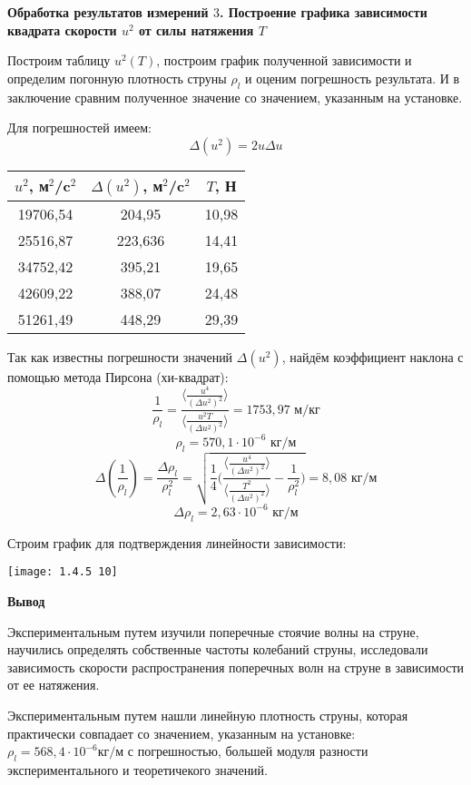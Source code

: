 \documentclass[a4paper,12pt]{article} %
\begin{document}
{\bf Обработка результатов измерений $3$. Построение графика зависимости квадрата скорости $u^2$ от силы натяжения
$T$}

Построим таблицу $u^2(T)$, построим график полученной зависимости и определим погонную плотность струны $\rho_l$ и оценим погрешность результата. И в заключение сравним полученное значение со значением, указанным на установке.

Для погрешностей имеем:
\[\Delta (u^2) = 2u\Delta u\]

\begin{center}
\begin{tabular}{|c|c|c|}
\hline 
$u^2$, м$^2$/c$^2$ & $\Delta (u^2)$, м$^2$/c$^2$& $T$, Н \\ 
\hline 
19706,54 &204,95& 10,98 \\ 
\hline 
25516,87 &223,636& 14,41 \\ 
\hline 
34752,42 &395,21& 19,65 \\ 
\hline 
42609,22 &388,07& 24,48 \\ 
\hline 
51261,49 &448,29& 29,39 \\ 
\hline 
\end{tabular} 
\end{center}

Так как известны погрешности значений $\Delta (u^2)$, найдём коэффициент наклона с помощью метода Пирсона (хи-квадрат):
\[\frac{1}{\rho_l} = \frac{\langle \frac{u^4}{(\Delta u^2)^2} \rangle}{\langle \frac{u^2 T}{(\Delta u^2)^2} \rangle}  = 1753,97 \text{ м/кг}\]
\[\rho_l = 570,1 \cdot 10^{-6} \text{ кг/м}\]
\[\Delta (\frac{1}{\rho_l}) = \frac{\Delta \rho_l}{\rho^2_l} = \sqrt{\frac{1}{4} \Big( \frac{\langle \frac{u^4}{(\Delta u^2)^2} \rangle}{\langle \frac{T^2}{(\Delta u^2)^2} \rangle}  - \frac{1}{\rho_l^2}\Big)} = 8,08 \text{ кг/м}\]
\[\Delta \rho_l = 2,63  \cdot 10^{-6} \text{ кг/м}\]

Строим график для подтверждения линейности зависимости:

\begin{center}
\texttt{[image: 1.4.5 10]}
\end{center}

{\bf Вывод }

Экспериментальным путем изучили поперечные стоячие волны на струне, научились определять собственные частоты колебаний струны, исследовали зависимость скорости распространения поперечных волн на струне в зависимости от ее натяжения. 

Экспериментальным путем нашли линейную плотность струны, которая практически совпадает со значением, указанным на установке: $\rho_l = 568,4 \cdot 10^{-6} \text{кг/м}$ с погрешностью, большей модуля разности экспериментального и теоретичекого значений.
\end{document}
